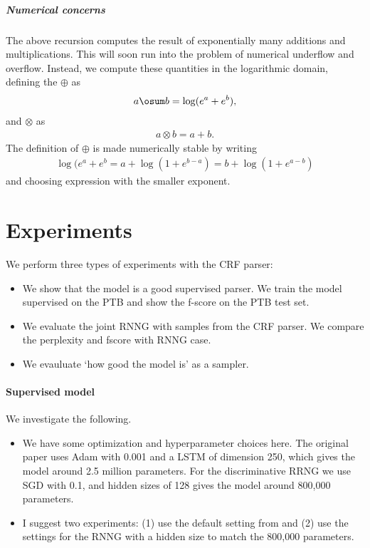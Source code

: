 \subparagraph{Numerical concerns}
The above recursion computes the result of exponentially many additions and multiplications. This will soon run into the problem of numerical underflow and overflow. Instead, we compute these quantities in the logarithmic domain, defining the $\oplus$ as
\begin{align*}
  a \osum b = \log(e^{a} + e^{b}),
\end{align*}
and $\otimes$ as
\begin{align*}
  a \otimes b = a + b.
\end{align*}
The definition of $\oplus$ is made numerically stable by writing
\begin{align*}
  \log(e^{a} + e^{b} = a + \log(1 + e^{b-a}) = b + \log(1 + e^{a-b})
\end{align*}
and choosing expression with the smaller exponent.


\section{Experiments}
We perform three types of experiments with the CRF parser:
\begin{itemize}
  \item We show that the model is a good supervised parser. We train the model supervised on the PTB and show the f-score on the PTB test set.
  \item We evaluate the joint RNNG with samples from the CRF parser. We compare the perplexity and fscore with RNNG case.
  \item We evauluate `how good the model is' as a sampler.
\end{itemize}

\paragraph{Supervised model} We investigate the following.
\begin{itemize}
  \item We have some optimization and hyperparameter choices here. The original paper uses Adam with 0.001 and a LSTM of dimension 250, which gives the model around 2.5 million parameters. For the discriminative RRNG we use SGD with 0.1, and hidden sizes of 128 gives the model around 800,000 parameters.
  \item I suggest two experiments: (1) use the default setting from \citep{stern2017minimal} and (2) use the settings for the RNNG with a hidden size to match the 800,000 parameters.
\end{itemize}

